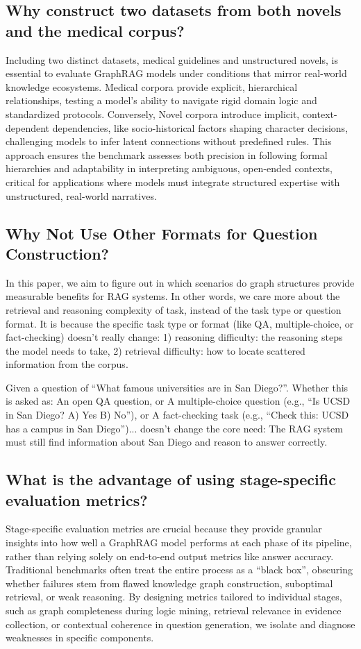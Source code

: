 \documentclass{article} %
\begin{document}
\subsection{Why construct two datasets from both novels and the medical corpus?} 
Including two distinct datasets, medical guidelines and unstructured novels, is essential to evaluate GraphRAG models under conditions that mirror real-world knowledge ecosystems.  Medical corpora provide explicit, hierarchical relationships, testing a model’s ability to navigate rigid domain logic and standardized protocols. Conversely, Novel corpora introduce implicit, context-dependent dependencies, like socio-historical factors shaping character decisions, challenging models to infer latent connections without predefined rules. This approach ensures the benchmark assesses both precision in following formal hierarchies and adaptability in interpreting ambiguous, open-ended contexts, critical for applications where models must integrate structured expertise with unstructured, real-world narratives.

\subsection{Why Not Use Other Formats for Question Construction?}
In this paper, we aim to figure out in which scenarios do graph structures provide measurable benefits for RAG systems. In other words, we care more about the retrieval and reasoning complexity of task, instead of the task type or question format. It is because the specific task type or format (like QA, multiple-choice, or fact-checking) doesn't really change: 1) reasoning difficulty: the reasoning steps the model needs to take, 2) retrieval difficulty: how to locate scattered information from the corpus.

Given a question of ``What famous universities are in San Diego?''. Whether this is asked as:
An open QA question, or A multiple-choice question (e.g., ``Is UCSD in San Diego? A) Yes B) No''), or A fact-checking task (e.g., ``Check this: UCSD has a campus in San Diego'')... doesn't change the core need: The RAG system must still find information about San Diego and reason to answer correctly.

\subsection{What is the advantage of using stage-specific evaluation metrics?}
Stage-specific evaluation metrics are crucial because they provide granular insights into how well a GraphRAG model performs at each phase of its pipeline, rather than relying solely on end-to-end output metrics like answer accuracy. Traditional benchmarks often treat the entire process as a ``black box'', obscuring whether failures stem from flawed knowledge graph construction, suboptimal retrieval, or weak reasoning. By designing metrics tailored to individual stages, such as graph completeness during logic mining, retrieval relevance in evidence collection, or contextual coherence in question generation, we isolate and diagnose weaknesses in specific components.
\end{document}
